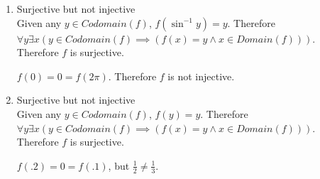 \documentclass{article}
\begin{document}
\begin{enumerate}
		\item
			Surjective but not injective\\
Given any $y \in Codomain(f)$, $f(\sin^{-1} y) = y$. Therefore $\forall y \exists x (y \in Codomain(f) \implies (f(x) = y \land x \in Domain(f)))$. Therefore $f$ is surjective.

$ f(0) = 0 = f(2 \pi) $. Therefore $f$ is not injective.

		\item			
			Surjective but not injective\\
Given any $y \in Codomain(f)$, $f(y) = y$. Therefore $\forall y \exists x (y \in Codomain(f) \implies (f(x) = y \land x \in Domain(f)))$. Therefore $f$ is surjective.

$f(.2) = 0 = f(.1)$, but $\frac{1}{2} \neq \frac{1}{3}$.

	\end{enumerate}
\end{document}
